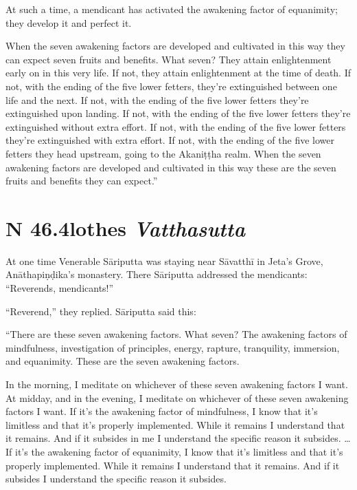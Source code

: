 \documentclass[12pt,openany]{book}%
\newcommand*{\suttatitleacronym}[1]{\smaller[2]{#1}\vspace*{.3em}}
\newcommand*{\suttatitletranslation}[1]{\linebreak{#1}}
\newcommand*{\suttatitleroot}[1]{\linebreak\smaller[2]\itshape{#1}}
\newcommand*{\tocacronym}[1]{\hspace*{-3.3em}{#1}\quad}
\newcommand*{\toctranslation}[1]{#1}
\newcommand*{\tocroot}[1]{(\textit{#1})}
\begin{document}
At such a time, a mendicant has activated the awakening factor of equanimity; they develop it and perfect it. 

When the seven awakening factors are developed and cultivated in this way they can expect seven fruits and benefits. What seven? They attain enlightenment early on in this very life. If not, they attain enlightenment at the time of death. If not, with the ending of the five lower fetters, they’re extinguished between one life and the next. If not, with the ending of the five lower fetters they’re extinguished upon landing. If not, with the ending of the five lower fetters they’re extinguished without extra effort. If not, with the ending of the five lower fetters they’re extinguished with extra effort. If not, with the ending of the five lower fetters they head upstream, going to the \textsanskrit{Akaniṭṭha} realm. When the seven awakening factors are developed and cultivated in this way these are the seven fruits and benefits they can expect.” 

%
\section*{{\suttatitleacronym SN 46.4}{\suttatitletranslation Clothes }{\suttatitleroot Vatthasutta}}
\addcontentsline{toc}{section}{\tocacronym{SN 46.4} \toctranslation{Clothes } \tocroot{Vatthasutta}}

At one time Venerable \textsanskrit{Sāriputta} was staying near \textsanskrit{Sāvatthī} in Jeta’s Grove, \textsanskrit{Anāthapiṇḍika}’s monastery. There \textsanskrit{Sāriputta} addressed the mendicants: “Reverends, mendicants!” 

“Reverend,” they replied. \textsanskrit{Sāriputta} said this: 

“There are these seven awakening factors. What seven? The awakening factors of mindfulness, investigation of principles, energy, rapture, tranquility, immersion, and equanimity. These are the seven awakening factors. 

In the morning, I meditate on whichever of these seven awakening factors I want. At midday, and in the evening, I meditate on whichever of these seven awakening factors I want. If it’s the awakening factor of mindfulness, I know that it’s limitless and that it’s properly implemented. While it remains I understand that it remains. And if it subsides in me I understand the specific reason it subsides. … If it’s the awakening factor of equanimity, I know that it’s limitless and that it’s properly implemented. While it remains I understand that it remains. And if it subsides I understand the specific reason it subsides. 
\end{document}
